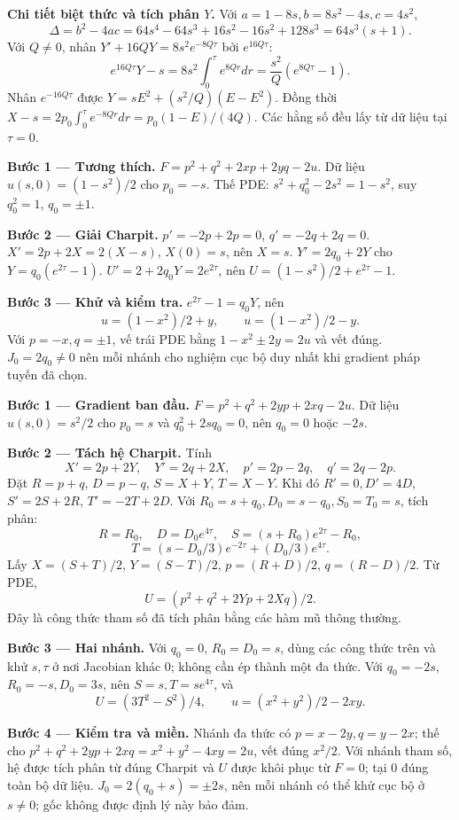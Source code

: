 \textbf{Chi tiết biệt thức và tích phân $Y$.} Với $a=1-8s,b=8s^2-4s,c=4s^2$,
\[\Delta=b^2-4ac=64s^4-64s^3+16s^2-16s^2+128s^3=64s^3(s+1).\]
Với $Q\ne0$, nhân $Y'+16QY=8s^2e^{-8Q\tau}$ bởi $e^{16Q\tau}$:
\[e^{16Q\tau}Y-s=8s^2\int_0^\tau e^{8Qr}dr=\frac{s^2}{Q}(e^{8Q\tau}-1).\]
Nhân $e^{-16Q\tau}$ được $Y=sE^2+(s^2/Q)(E-E^2)$. Đồng thời $X-s=2p_0\int_0^\tau e^{-8Qr}dr=p_0(1-E)/(4Q)$. Các hằng số đều lấy từ dữ liệu tại $\tau=0$.

\textbf{Bước 1 — Tương thích.} $F=p^2+q^2+2xp+2yq-2u$. Dữ liệu $u(s,0)=(1-s^2)/2$ cho $p_0=-s$. Thế PDE: $s^2+q_0^2-2s^2=1-s^2$, suy $q_0^2=1$, $q_0=\pm1$.

\textbf{Bước 2 — Giải Charpit.} $p'=-2p+2p=0$, $q'=-2q+2q=0$. $X'=2p+2X=2(X-s)$, $X(0)=s$, nên $X=s$. $Y'=2q_0+2Y$ cho $Y=q_0(e^{2\tau}-1)$. $U'=2+2q_0Y=2e^{2\tau}$, nên $U=(1-s^2)/2+e^{2\tau}-1$.

\textbf{Bước 3 — Khử và kiểm tra.} $e^{2\tau}-1=q_0Y$, nên
\[u=(1-x^2)/2+y,\qquad u=(1-x^2)/2-y.\]
Với $p=-x,q=\pm1$, vế trái PDE bằng $1-x^2\pm2y=2u$ và vết đúng. $J_0=2q_0\ne0$ nên mỗi nhánh cho nghiệm cục bộ duy nhất khi gradient pháp tuyến đã chọn.

\textbf{Bước 1 — Gradient ban đầu.} $F=p^2+q^2+2yp+2xq-2u$. Dữ liệu $u(s,0)=s^2/2$ cho $p_0=s$ và $q_0^2+2sq_0=0$, nên $q_0=0$ hoặc $-2s$.

\textbf{Bước 2 — Tách hệ Charpit.} Tính
\[X'=2p+2Y,\quad Y'=2q+2X,\quad p'=2p-2q,\quad q'=2q-2p.\]
Đặt $R=p+q$, $D=p-q$, $S=X+Y$, $T=X-Y$. Khi đó $R'=0,D'=4D$, $S'=2S+2R$, $T'=-2T+2D$. Với $R_0=s+q_0,D_0=s-q_0,S_0=T_0=s$, tích phân:
\[R=R_0,\quad D=D_0e^{4\tau},\quad S=(s+R_0)e^{2\tau}-R_0,\]
\[T=(s-D_0/3)e^{-2\tau}+(D_0/3)e^{4\tau}.\]
Lấy $X=(S+T)/2$, $Y=(S-T)/2$, $p=(R+D)/2$, $q=(R-D)/2$. Từ PDE,
\[U=(p^2+q^2+2Yp+2Xq)/2.\]
Đây là công thức tham số đã tích phân bằng các hàm mũ thông thường.

\textbf{Bước 3 — Hai nhánh.} Với $q_0=0$, $R_0=D_0=s$, dùng các công thức trên và khử $s,\tau$ ở nơi Jacobian khác 0; không cần ép thành một đa thức. Với $q_0=-2s$, $R_0=-s,D_0=3s$, nên $S=s,T=se^{4\tau}$, và
\[U=(3T^2-S^2)/4,\qquad u=(x^2+y^2)/2-2xy.\]

\textbf{Bước 4 — Kiểm tra và miền.} Nhánh đa thức có $p=x-2y,q=y-2x$; thế cho $p^2+q^2+2yp+2xq=x^2+y^2-4xy=2u$, vết đúng $x^2/2$. Với nhánh tham số, hệ được tích phân từ đúng Charpit và $U$ được khôi phục từ $F=0$; tại 0 đúng toàn bộ dữ liệu. $J_0=2(q_0+s)=\pm2s$, nên mỗi nhánh có thể khử cục bộ ở $s\ne0$; gốc không được định lý này bảo đảm.

